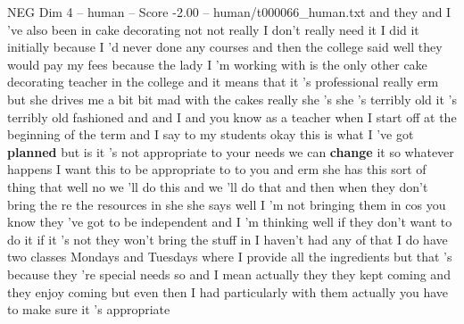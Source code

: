 \begin{textsample}{NEG Dim 4 – human – Score -2.00 – human/t000066\_human.txt}  \label{ex:f4_neg_033}
and they and I 've also been in cake decorating not not really I don't really need it I did it initially because I 'd never done any courses and then the college said well they would pay my fees because the lady I 'm working with is the only other cake decorating teacher in the college and it means that it 's professional really erm but she drives me a bit bit mad with the cakes really she 's she 's terribly old it 's terribly old fashioned and and I and you know as a teacher when I start off at the beginning of the term and I say to my students okay this is what I 've got \textbf{planned} but is it 's not appropriate to your needs we can \textbf{change} it so whatever happens I want this to be appropriate to to you and erm she has this sort of thing that well no we 'll do this and we 'll do that and then when they don't bring the re the resources in she she says well I 'm not bringing them in cos you know they 've got to be independent and I 'm thinking well if they don't want to do it if it 's not they won't bring the stuff in I haven't had any of that I do have two classes Mondays and Tuesdays where I provide all the ingredients but that 's because they 're special needs so and I mean actually they they kept coming and they enjoy coming but even then I had particularly with them actually you have to make sure it 's appropriate

\end{textsample}
